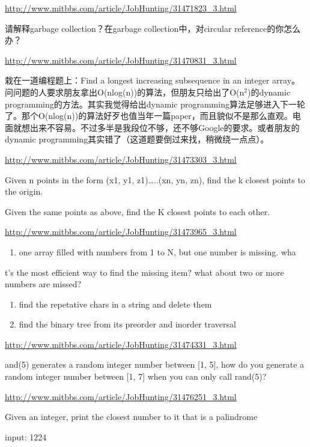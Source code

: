 \documentclass[12pt]{book}
\begin{document}
\url{http://www.mitbbs.com/article/JobHunting/31471823_3.html}

请解释garbage collection？在garbage collection中，对circular reference的你怎么办？

\url{http://www.mitbbs.com/article/JobHunting/31470831_3.html}

栽在一道编程题上：Find a longest increasing subsequence in an integer array。问问题的人要求朋友拿出O(nlog(n))的算法，但朋友只给出了O(n$^{\text{2}}$)的dynamic programming的方法。其实我觉得给出dynamic programming算法足够进入下一轮了。那个O(nlog(n))的算法好歹也值当年一篇paper，而且貌似不是那么直观。电面就想出来不容易。不过多半是我段位不够，还不够Google的要求。或者朋友的dynamic programming其实错了（这道题要倒过来找，稍微绕一点点）。

\url{http://www.mitbbs.com/article/JobHunting/31473303_3.html}

Given n points in the form (x1, y1, z1)…..(xn, yn, zn), find the k closest points to the origin.

Given the same points as above, find the K closest points to each other.

\url{http://www.mitbbs.com/article/JobHunting/31473965_3.html}

\begin{enumerate}
\item one array filled with numbers from 1 to N, but one number is missing. wha
\end{enumerate}
t's the most efficient way to find the missing item? what about two or more 
numbers are missed?

\begin{enumerate}
\item find the repetative chars in a string and delete them

\item find the binary tree from its preorder and inorder traversal
\end{enumerate}

\url{http://www.mitbbs.com/article/JobHunting/31474331_3.html}

and(5) generates a random integer number between [1, 5], how do you 
generate a random integer number between [1, 7] when you can only call 
rand(5)?

\url{http://www.mitbbs.com/article/JobHunting/31476251_3.html}

Given an integer, print the closest number to it that is a palindrome

input: 1224 
\end{document}
